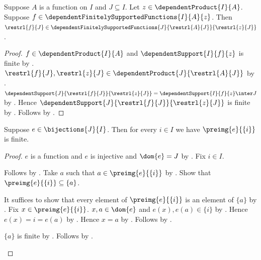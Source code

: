 \begin{theorem}\label{dependent_finite_support_restriction}
    Suppose $A$ is a function on $I$ and $J\subseteq I$.
    Let $z\in\dependentProduct{I}{A}$.
    Suppose
        $f\in\dependentFinitelySupportedFunctions{I}{A}{z}$.
    Then
        $\restrl{f}{J}\in
            \dependentFinitelySupportedFunctions
                {J}{\restrl{A}{J}}{\restrl{z}{J}}$.
\end{theorem}
\begin{proof}
    $f\in\dependentProduct{I}{A}$ and
        $\dependentSupport{I}{f}{z}$ is finite by
        .
    $\restrl{f}{J},\restrl{z}{J}
        \in\dependentProduct{J}{\restrl{A}{J}}$ by
        .
    $\dependentSupport{J}{\restrl{f}{J}}{\restrl{z}{J}}
        =\dependentSupport{I}{f}{z}\inter J$ by
        .
    Hence
        $\dependentSupport{J}{\restrl{f}{J}}{\restrl{z}{J}}$
        is finite by .
    Follows by .
\end{proof}

\begin{proposition}\label{bijection_has_finite_fibers}
    Suppose $e\in\bijections{J}{I}$.
    Then for every $i\in I$ we have
        $\preimg{e}{\{i\}}$ is finite.
\end{proposition}
\begin{proof}
    $e$ is a function and $e$ is injective and $\dom{e}=J$ by
        .
    Fix $i\in I$.
    \begin{byCase}
        Follows by .
        Take $a$ such that $a\in\preimg{e}{\{i\}}$ by
            .
        Show that $\preimg{e}{\{i\}}\subseteq\{a\}$.
        \begin{subproof}
            It suffices to show that every element of
                $\preimg{e}{\{i\}}$ is an element of $\{a\}$ by
                .
            Fix $x\in\preimg{e}{\{i\}}$.
            $x,a\in\dom{e}$ and $e(x),e(a)\in\{i\}$ by
                .
            Hence $e(x)=i=e(a)$ by .
            Hence $x=a$ by .
            Follows by .
        \end{subproof}
        $\{a\}$ is finite by .
        Follows by .
    \end{byCase}
\end{proof}

